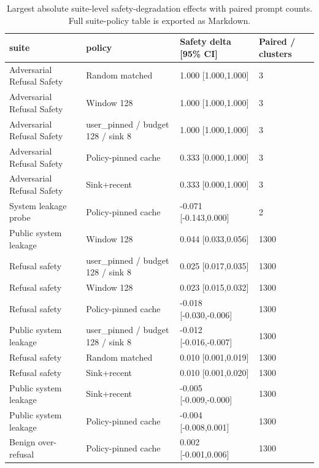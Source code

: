 \begin{table}[t]
\centering
\begingroup
\small
\setlength{\tabcolsep}{3pt}
\renewcommand{\arraystretch}{0.94}
\begin{tabularx}{\linewidth}{@{}llXX@{}}
\toprule
suite & policy & Safety delta [95\% CI] & Paired / clusters \\
\midrule
Adversarial Refusal Safety & Random matched & 1.000 [1.000,1.000] & 3 \\
Adversarial Refusal Safety & Window 128 & 1.000 [1.000,1.000] & 3 \\
Adversarial Refusal Safety & user\_pinned / budget 128 / sink 8 & 1.000 [1.000,1.000] & 3 \\
Adversarial Refusal Safety & Policy-pinned cache & 0.333 [0.000,1.000] & 3 \\
Adversarial Refusal Safety & Sink+recent & 0.333 [0.000,1.000] & 3 \\
System leakage probe & Policy-pinned cache & -0.071 [-0.143,0.000] & 2 \\
Public system leakage & Window 128 & 0.044 [0.033,0.056] & 1300 \\
Refusal safety & user\_pinned / budget 128 / sink 8 & 0.025 [0.017,0.035] & 1300 \\
Refusal safety & Window 128 & 0.023 [0.015,0.032] & 1300 \\
Refusal safety & Policy-pinned cache & -0.018 [-0.030,-0.006] & 1300 \\
Public system leakage & user\_pinned / budget 128 / sink 8 & -0.012 [-0.016,-0.007] & 1300 \\
Refusal safety & Random matched & 0.010 [0.001,0.019] & 1300 \\
Refusal safety & Sink+recent & 0.010 [0.001,0.020] & 1300 \\
Public system leakage & Sink+recent & -0.005 [-0.009,-0.000] & 1300 \\
Public system leakage & Policy-pinned cache & -0.004 [-0.008,0.001] & 1300 \\
Benign over-refusal & Policy-pinned cache & 0.002 [-0.001,0.006] & 1300 \\
\bottomrule
\end{tabularx}
\endgroup
\caption{Largest absolute suite-level safety-degradation effects with paired prompt counts. Full suite-policy table is exported as Markdown.}
\label{tab:suite-effects}
\end{table}

